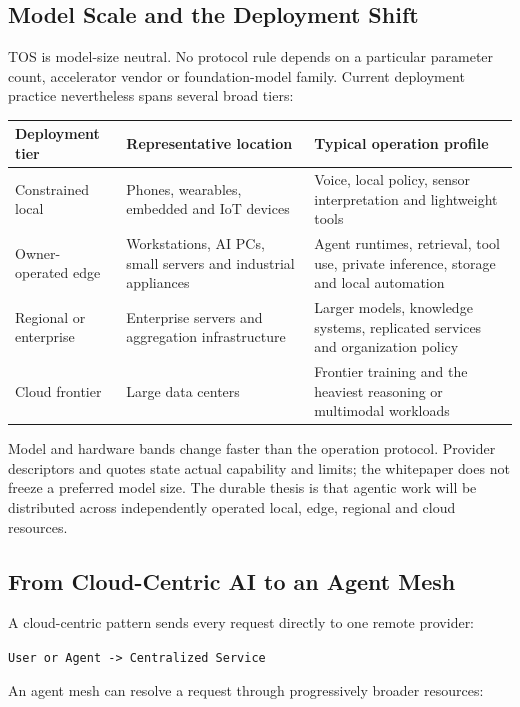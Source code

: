 \documentclass[11pt,oneside]{article}
\begin{document}
\subsection{Model Scale and the Deployment Shift}
\label{sec:model-scale-shift}

TOS is model-size neutral. No protocol rule depends on a particular parameter count,
accelerator vendor or foundation-model family. Current deployment practice nevertheless spans
several broad tiers:

\begin{longtable}{L{0.18\textwidth}L{0.32\textwidth}L{0.39\textwidth}}
\toprule
Deployment tier & Representative location & Typical operation profile \\
\midrule
\endhead
Constrained local &
Phones, wearables, embedded and IoT devices &
Voice, local policy, sensor interpretation and lightweight tools \\
Owner-operated edge &
Workstations, AI PCs, small servers and industrial appliances &
Agent runtimes, retrieval, tool use, private inference, storage and local automation \\
Regional or enterprise &
Enterprise servers and aggregation infrastructure &
Larger models, knowledge systems, replicated services and organization policy \\
Cloud frontier &
Large data centers &
Frontier training and the heaviest reasoning or multimodal workloads \\
\bottomrule
\end{longtable}

Model and hardware bands change faster than the operation protocol. Provider descriptors and
quotes state actual capability and limits; the whitepaper does not freeze a preferred model
size. The durable thesis is that agentic work will be distributed across independently
operated local, edge, regional and cloud resources.

\subsection{From Cloud-Centric AI to an Agent Mesh}
\label{sec:agent-mesh}

A cloud-centric pattern sends every request directly to one remote provider:

\begin{center}
\texttt{User or Agent -> Centralized Service}
\end{center}

An agent mesh can resolve a request through progressively broader resources:
\end{document}
